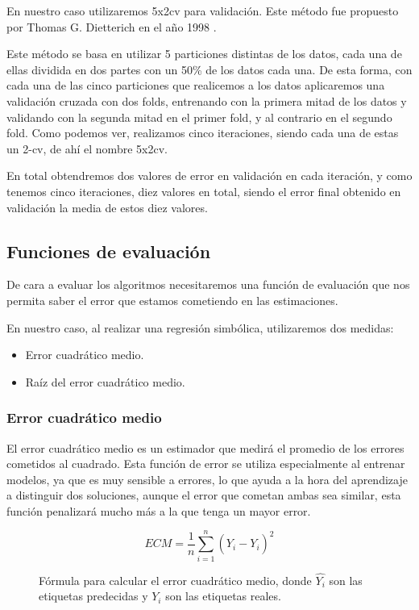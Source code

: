 En nuestro caso utilizaremos 5x2cv para validación. Este método fue propuesto por Thomas G. Dietterich en el año 1998 \cite{propuesta5x2cv}.

Este método se basa en utilizar 5 particiones distintas de los datos, cada una de ellas dividida en dos partes con un 50\% de los datos cada una. De esta forma, con cada una de las cinco particiones que realicemos a los datos aplicaremos una validación cruzada con dos folds, entrenando con la primera mitad de los datos y validando con la segunda mitad en el primer fold, y al contrario en el segundo fold. Como podemos ver, realizamos cinco iteraciones, siendo cada una de estas un 2-cv, de ahí el nombre 5x2cv.

En total obtendremos dos valores de error en validación en cada iteración, y como tenemos cinco iteraciones, diez valores en total, siendo el error final obtenido en validación la media de estos diez valores.



\newpage

\subsection{Funciones de evaluación}

De cara a evaluar los algoritmos necesitaremos una función de evaluación que nos permita saber el error que estamos cometiendo en las estimaciones.

En nuestro caso, al realizar una regresión simbólica, utilizaremos dos medidas:

\begin{itemize}
	\item Error cuadrático medio.
	\item Raíz del error cuadrático medio.
\end{itemize}

\subsubsection{Error cuadrático medio}

El error cuadrático medio es un estimador que medirá el promedio de los errores cometidos al cuadrado. Esta función de error se utiliza especialmente al entrenar modelos, ya que es muy sensible a errores, lo que ayuda a la hora del aprendizaje a distinguir dos soluciones, aunque el error que cometan ambas sea similar, esta función penalizará mucho más a la que tenga un mayor error.

\begin{figure}[H]
	 \centering
	 $$ ECM = \frac{1}{n} \sum_{i = 1}^{n}(\hat{Y_i} - Y_i)^2 $$
	 \caption{Fórmula para calcular el error cuadrático medio, donde $\hat{Y_i}$ son las etiquetas predecidas y $Y_i$ son las etiquetas reales.}
	\label{fig:ECM}
\end{figure}

